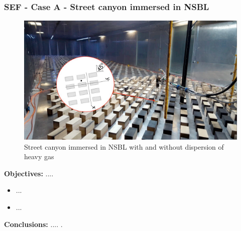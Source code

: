 \subsubsection{SEF - Case A - Street canyon immersed in NSBL}
    \begin{figure}[h!]
        \hypertarget{link:sef_A}{}
        \centering
        \includegraphics[scale=0.8]{imgs/sef_dataset_image.png}
        \caption{Street canyon immersed in NSBL with and without dispersion
        of heavy gas}
    \end{figure}
    \textbf{Objectives:} ....\newline
    \begin{itemize}
        \item ...
        \item ...
    \end{itemize}
    \textbf{Conclusions:} .... .\newline

